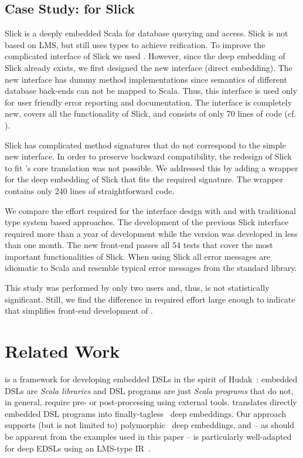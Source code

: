 \section{Case Study: \yy for Slick}
\label{subsec:slick}
Slick is a deeply embedded Scala \edsl for database querying and access. Slick
is not based on LMS, but still uses  types to achieve reification.
To improve the complicated interface of Slick we used \yy.
However, since the deep embedding of Slick already exists, we first designed the new
interface (direct embedding). The new interface has dummy method
implementations since semantics of different database back-ends can not be
mapped to Scala. Thus, this interface is used only for user friendly error reporting and
documentation. The interface is completely new, covers all the functionality of Slick,
 and consists of only 70 lines of code (cf. \cite{techrep}).

Slick has complicated method signatures that do not correspond to the simple new
interface. In order to preserve backward compatibility, the redesign of Slick to
fit \yy's core translation was not possible. We addressed this by adding a
wrapper for the deep embedding of Slick that fits the required signature.
The wrapper contains only 240 lines of straightforward code.

We compare the effort required for the interface design with \yy and with
traditional type system based approaches. The development of the previous Slick
interface required more than a year of development while the \yy version was
developed in less than one month. The new front-end passes all 54 tests that cover the
most important functionalities of Slick. When using Slick all error messages are
idiomatic to Scala and resemble typical error messages from the standard
library.

This study was performed by only two users and, thus, is not statistically
significant. Still, we find the difference in required effort large enough to indicate that \yy
simplifies front-end development of \edsls.


\chapter{Related Work}
\label{sec:related-work}

\yy is a framework for developing embedded DSLs in the spirit of
Hudak~\cite{Hudak96csur,Hudak98sr}: embedded DSLs are \emph{Scala
  libraries} and DSL programs are just \emph{Scala programs} that do
not, in general, require pre- or post-processing using external tools.
\yy translates directly embedded DSL programs into
finally-tagless~\cite{carette_finally_2009} deep embeddings.  Our
approach supports (but is not limited to)
polymorphic~\cite{hofer_polymorphic_2008} deep embeddings, and -- as
should be apparent from the examples used in this paper -- is
particularly well-adapted for deep EDSLs using an LMS-type
IR~\cite{rompf_scala-virtualized:_2009,rompf_optimizing_2013}.


